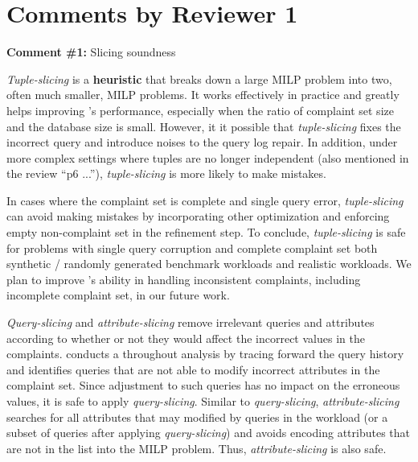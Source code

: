 \section*{Comments by Reviewer 1}

\noindent
\textbf{Comment \#1:} Slicing soundness
\begin{quote}
\end{quote}

\emph{Tuple-slicing} is a \textbf{heuristic} that breaks down a large MILP problem 
into two, often much smaller, MILP problems. It works effectively in practice and 
greatly helps improving \sys's performance, especially when the ratio of complaint 
set size and the database size is small. However, it it possible that \emph{tuple-slicing} 
fixes the incorrect query and introduce noises to the query log repair. In addition, 
under more complex settings where tuples are no longer independent 
(also mentioned in the review ``p6 ...''), \emph{tuple-slicing} 
is more likely to make mistakes. 

In cases where the complaint set is complete and single query error,
 \emph{tuple-slicing} can avoid making mistakes by incorporating other optimization and
  enforcing empty non-complaint set
in the refinement step. 
To conclude, \emph{tuple-slicing} is safe for problems with single query corruption and complete complaint set both synthetic / randomly
generated benchmark workloads and realistic workloads. We plan to improve \sys's ability in handling 
inconsistent complaints, including incomplete complaint set, in our future work.

\emph{Query-slicing} and \emph{attribute-slicing} remove irrelevant queries and attributes 
according to whether or not they would affect the incorrect values in the complaints. 
\sys conducts a throughout analysis by tracing forward the query history and identifies
queries that are not able to modify incorrect attributes in the complaint set. Since adjustment
to such queries has no impact on the erroneous values, it is safe to apply \emph{query-slicing}. 
Similar to \emph{query-slicing}, \emph{attribute-slicing} searches for all attributes that may
modified by queries in the workload (or a subset of queries after applying \emph{query-slicing}) and
avoids encoding attributes that are not in the list into the MILP problem. Thus, \emph{attribute-slicing}
is also safe. 

